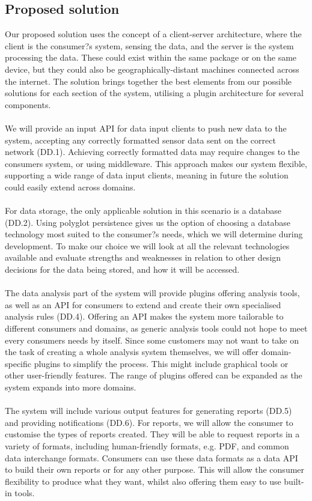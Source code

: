 \documentclass[10pt,a4paper]{article}
\begin{document}
\subsection{Proposed solution}
Our proposed solution uses the concept of a client-server architecture, where the client is the consumer?s system, sensing the data, and the server is the system processing the data. These could exist within the same package or on the same device, but they could also be geographically-distant machines connected across the internet. The solution brings together the best elements from our possible solutions for each section of the system, utilising a plugin architecture for several components.
\\ \\
We will provide an input API for data input clients to push new data to the system, accepting any correctly formatted sensor data sent on the correct network (DD.1). Achieving correctly formatted data may require changes to the consumers system, or using middleware. This approach makes our system flexible, supporting a wide range of data input clients, meaning in future the solution could easily extend across domains.
\\ \\
For data storage, the only applicable solution in this scenario is a database (DD.2). Using polyglot persistence gives us the option of choosing a database technology most suited to the consumer?s needs, which we will determine during development. To make our choice we will look at all the relevant technologies available and evaluate strengths and weaknesses in relation to other design decisions for the data being stored, and how it will be accessed.
\\ \\
The data analysis part of the system will provide plugins offering analysis tools, as well as an API for consumers to extend and create their own specialised analysis rules (DD.4). Offering an API makes the system more tailorable to different consumers and domains, as generic analysis tools could not hope to meet every consumers needs by itself. Since some customers may not want to take on the task of creating a whole analysis system themselves, we will offer domain-specific plugins to simplify the process. This might include graphical tools or other user-friendly features. The range of plugins offered can be expanded as the system expands into more domains.
\\ \\
The system will include various output features for generating reports (DD.5) and providing notifications (DD.6). For reports, we will allow the consumer to customise the types of reports created. They will be able to request reports in a variety of formats, including human-friendly formats, e.g. PDF, and common data interchange formats. Consumers can use these data formats as a data API to build their own reports or for any other purpose. This will allow the consumer flexibility to produce what they want, whilst also offering them easy to use built-in tools.
\end{document}
